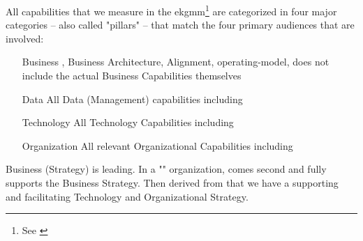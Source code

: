 All capabilities that we measure in the \gls{ekgmm}\footnote{See \cite{ekgmm}} are categorized
in four major categories -- also called "pillars" -- that match the four primary audiences that are involved:

\begin{enumerate}[leftmargin=1in,font=\bfseries]
    \item [Business]     ,
                         Business Architecture, Alignment,
                         \Gls{operating-model}, does not include the actual Business Capabilities
                          themselves
    \item [Data]         All Data (Management) capabilities including 
    \item [Technology]   All Technology Capabilities including 
    \item [Organization] All relevant Organizational Capabilities including 
\end{enumerate}

Business (Strategy) is leading.
In a "" organization,  comes second and fully supports the
Business Strategy.
Then derived from that we have a supporting and facilitating Technology and Organizational Strategy.
